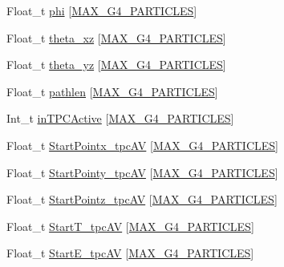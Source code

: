 \begin{DoxyCompactItemize}
\item 
Float\-\_\-t \hyperlink{classanatree_a1d3be537590687fc34b9071711b472f2}{phi} \mbox{[}\hyperlink{anatree__core__v09410002_8h_aa5cbba5cc53c011e88805f38503de894}{M\-A\-X\-\_\-\-G4\-\_\-\-P\-A\-R\-T\-I\-C\-L\-E\-S}\mbox{]}
\item 
Float\-\_\-t \hyperlink{classanatree_af77af6e17993e4b2939e91cf761b853d}{theta\-\_\-xz} \mbox{[}\hyperlink{anatree__core__v09410002_8h_aa5cbba5cc53c011e88805f38503de894}{M\-A\-X\-\_\-\-G4\-\_\-\-P\-A\-R\-T\-I\-C\-L\-E\-S}\mbox{]}
\item 
Float\-\_\-t \hyperlink{classanatree_a16256bc2b5ba915bf7f406987e914460}{theta\-\_\-yz} \mbox{[}\hyperlink{anatree__core__v09410002_8h_aa5cbba5cc53c011e88805f38503de894}{M\-A\-X\-\_\-\-G4\-\_\-\-P\-A\-R\-T\-I\-C\-L\-E\-S}\mbox{]}
\item 
Float\-\_\-t \hyperlink{classanatree_a3de3ddbc0b1344bbf21c461c03a68ba8}{pathlen} \mbox{[}\hyperlink{anatree__core__v09410002_8h_aa5cbba5cc53c011e88805f38503de894}{M\-A\-X\-\_\-\-G4\-\_\-\-P\-A\-R\-T\-I\-C\-L\-E\-S}\mbox{]}
\item 
Int\-\_\-t \hyperlink{classanatree_ac37ca3f82d64c588fd9a26bdd4f3498f}{in\-T\-P\-C\-Active} \mbox{[}\hyperlink{anatree__core__v09410002_8h_aa5cbba5cc53c011e88805f38503de894}{M\-A\-X\-\_\-\-G4\-\_\-\-P\-A\-R\-T\-I\-C\-L\-E\-S}\mbox{]}
\item 
Float\-\_\-t \hyperlink{classanatree_a7c2896c7c9d15800bf2698b993894dfe}{Start\-Pointx\-\_\-tpc\-A\-V} \mbox{[}\hyperlink{anatree__core__v09410002_8h_aa5cbba5cc53c011e88805f38503de894}{M\-A\-X\-\_\-\-G4\-\_\-\-P\-A\-R\-T\-I\-C\-L\-E\-S}\mbox{]}
\item 
Float\-\_\-t \hyperlink{classanatree_aff4cc7905cae8c91dfae706d77fe894f}{Start\-Pointy\-\_\-tpc\-A\-V} \mbox{[}\hyperlink{anatree__core__v09410002_8h_aa5cbba5cc53c011e88805f38503de894}{M\-A\-X\-\_\-\-G4\-\_\-\-P\-A\-R\-T\-I\-C\-L\-E\-S}\mbox{]}
\item 
Float\-\_\-t \hyperlink{classanatree_ad71b098c7d57e1af196dd8620c08b861}{Start\-Pointz\-\_\-tpc\-A\-V} \mbox{[}\hyperlink{anatree__core__v09410002_8h_aa5cbba5cc53c011e88805f38503de894}{M\-A\-X\-\_\-\-G4\-\_\-\-P\-A\-R\-T\-I\-C\-L\-E\-S}\mbox{]}
\item 
Float\-\_\-t \hyperlink{classanatree_a960484efdcfc749574bb4ecf7ff6954c}{Start\-T\-\_\-tpc\-A\-V} \mbox{[}\hyperlink{anatree__core__v09410002_8h_aa5cbba5cc53c011e88805f38503de894}{M\-A\-X\-\_\-\-G4\-\_\-\-P\-A\-R\-T\-I\-C\-L\-E\-S}\mbox{]}
\item 
Float\-\_\-t \hyperlink{classanatree_a1a2088c9d8cade01f5dd8bb10d1f333c}{Start\-E\-\_\-tpc\-A\-V} \mbox{[}\hyperlink{anatree__core__v09410002_8h_aa5cbba5cc53c011e88805f38503de894}{M\-A\-X\-\_\-\-G4\-\_\-\-P\-A\-R\-T\-I\-C\-L\-E\-S}\mbox{]}

\end{DoxyCompactItemize}

